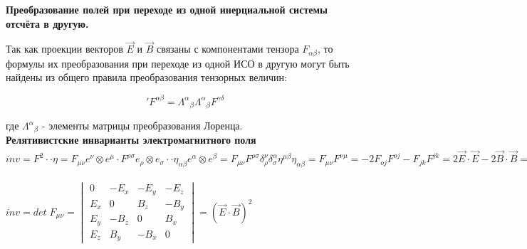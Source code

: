 \documentclass[__main__.tex]{subfiles}
\begin{document}
\textbf{Преобразование полей при переходе из одной инерциальной системы отсчёта в другую.}

Так как проекции векторов $\vec{E}$ и $\vec{B}$ связаны с компонентами тензора $F_{\alpha \beta}$, то формулы их преобразования при переходе из одной ИСО в другую могут быть найдены из общего правила преобразования тензорных величин:

$$'F^{\alpha \beta} = {\Lambda^{\alpha}}_\beta {\Lambda^{\alpha}}_\beta  F^{\gamma \delta}$$

где ${\Lambda^{\alpha}}_\beta$ - элементы матрицы преобразования Лоренца.\\

\textbf{Релятивистские инварианты электромагнитного поля}\\

$inv = F^2 \cdot \cdot \eta = F_{\mu\nu} e^\nu \otimes e^\mu \cdot F^{\rho\sigma} e_\rho \otimes e_\sigma \cdot \cdot \eta_{\alpha \beta} e^\alpha \otimes e^\beta = F_{\mu\nu} F^{\rho\sigma} \delta_{\rho}^{\nu} \delta_{\sigma}^{\alpha} \eta^{\mu\beta} \eta_{\alpha\beta} = F_{\mu\nu} F^{\nu\mu} = -2 F_{oj}F^{oj} - F_{jk}F^{jk} = 2\vec{E}\cdot\vec{E} - 2\vec{B}\cdot\vec{B} = 2(\vec{E}^2 - \vec{B}^2)$ 
	
$inv = det \; F_{\mu\nu} = \begin{vmatrix} 0 & -E_x & -E_y & -E_z \\ E_x & 0 & B_z & -B_y \\ E_y & -B_z & 0 & B_x \\ E_z & B_y & -B_x & 0 \end{vmatrix} = {(\vec{E} \cdot \vec{B})}^2$ 
\end{document}
